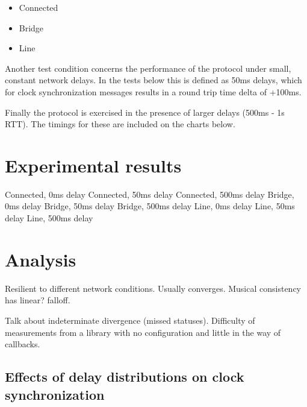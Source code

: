 \documentclass[11pt]{article} %
\theoremstyle{plain}
\theoremstyle{definition}
\begin{document}
\begin{itemize}
  \item Connected
  \item Bridge
  \item Line
\end{itemize}

Another test condition concerns the performance of the protocol under small,
constant network delays. In the tests below this is defined as 50ms delays,
which for clock synchronization messages results in a round trip time delta of
+100ms.

Finally the protocol is exercised in the presence of larger delays (500ms - 1s
RTT). The timings for these are included on the charts below.

\section{Experimental results}

Connected, 0ms delay
Connected, 50ms delay
Connected, 500ms delay
Bridge, 0ms delay
Bridge, 50ms delay
Bridge, 500ms delay
Line, 0ms delay
Line, 50ms delay
Line, 500ms delay











\section{Analysis}

Resilient to different network conditions. Usually converges. Musical consistency has linear? falloff.

Talk about indeterminate divergence (missed statuses). Difficulty of measurements from a library with no configuration and little in the way of callbacks.

\subsection{Effects of delay distributions on clock synchronization}
\end{document}
